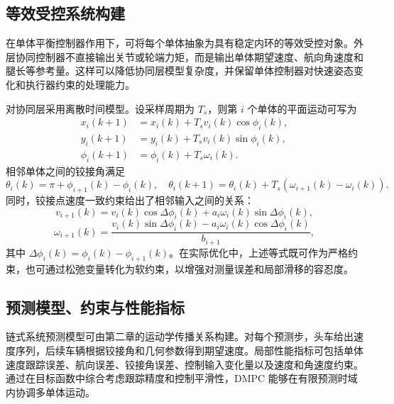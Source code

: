\documentclass[type=bachelor]{bithesis}
\begin{document}
\subsection{等效受控系统构建}
在单体平衡控制器作用下，可将每个单体抽象为具有稳定内环的等效受控对象。外层协同控制器不直接输出关节或轮端力矩，而是输出单体期望速度、航向角速度和腿长等参考量。这样可以降低协同层模型复杂度，并保留单体控制器对快速姿态变化和执行器约束的处理能力。

对协同层采用离散时间模型。设采样周期为 $T_s$，则第 $i$ 个单体的平面运动可写为
\begin{equation}
\begin{aligned}
  x_i(k+1)&=x_i(k)+T_sv_i(k)\cos\phi_i(k),\\
  y_i(k+1)&=y_i(k)+T_sv_i(k)\sin\phi_i(k),\\
  \phi_i(k+1)&=\phi_i(k)+T_s\omega_i(k).
\end{aligned}
\end{equation}
相邻单体之间的铰接角满足
\begin{equation}
  \theta_i(k)=\pi+\phi_{i+1}(k)-\phi_i(k),
  \quad
  \theta_i(k+1)=\theta_i(k)+T_s(\omega_{i+1}(k)-\omega_i(k)).
\end{equation}
同时，铰接点速度一致约束给出了相邻输入之间的关系：
\begin{equation}
  v_{i+1}(k)
  =
  v_i(k)\cos\Delta\phi_i(k)+a_i\omega_i(k)\sin\Delta\phi_i(k),
\end{equation}
\begin{equation}
  \omega_{i+1}(k)
  =
  \frac{v_i(k)\sin\Delta\phi_i(k)-a_i\omega_i(k)\cos\Delta\phi_i(k)}
  {b_{i+1}},
\end{equation}
其中 $\Delta\phi_i(k)=\phi_i(k)-\phi_{i+1}(k)$。在实际优化中，上述等式既可作为严格约束，也可通过松弛变量转化为软约束，以增强对测量误差和局部滑移的容忍度。

\subsection{预测模型、约束与性能指标}
链式系统预测模型可由第二章的运动学传播关系构建。对每个预测步，头车给出速度序列，后续车辆根据铰接角和几何参数得到期望速度。局部性能指标可包括单体速度跟踪误差、航向误差、铰接角误差、控制输入变化量以及速度和角速度约束。通过在目标函数中综合考虑跟踪精度和控制平滑性，DMPC 能够在有限预测时域内协调多单体运动。
\end{document}

